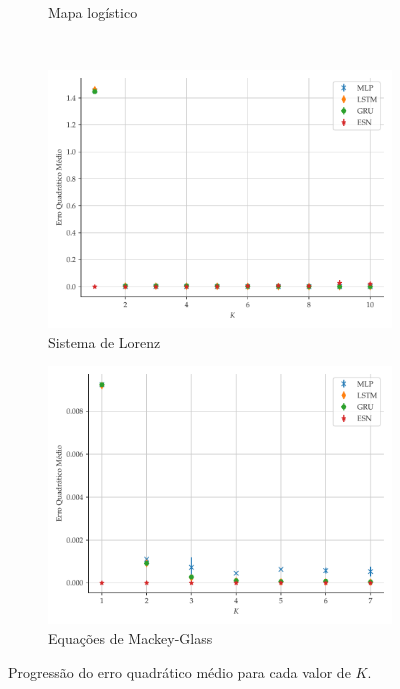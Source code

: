 \documentclass{beamer}
\begin{document}
\begin{frame}
\begin{figure}[H]
\begin{subfigure}[t]{0.4\textwidth}
         \caption{Mapa logístico}
     \end{subfigure}
     \centering
     \\
     \begin{subfigure}[t]{0.4\textwidth}
     \centering
         \includegraphics[scale=0.17]{progressao-k-lorenz.pdf}
         \caption{Sistema de Lorenz}
     \end{subfigure}
     \centering
     \begin{subfigure}[t]{0.4\textwidth} 
     \centering
         \includegraphics[scale=0.17]{progressao-k-mackeyglass.pdf}
         \caption{Equações de Mackey-Glass}
     \end{subfigure}  
     \centering   
     \caption{Progressão do erro quadrático médio para cada valor de $K$.}
     \label{fig:mse-progression}
\end{figure}
\end{frame}
\end{document}
